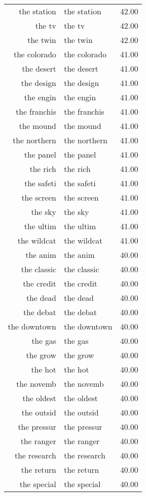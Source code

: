 \begin{table}[ht]
\begin{tabular}{rlr}
  the station & the station & 42.00 \\ 
  the tv & the tv & 42.00 \\ 
  the twin & the twin & 42.00 \\ 
  the colorado & the colorado & 41.00 \\ 
  the desert & the desert & 41.00 \\ 
  the design & the design & 41.00 \\ 
  the engin & the engin & 41.00 \\ 
  the franchis & the franchis & 41.00 \\ 
  the mound & the mound & 41.00 \\ 
  the northern & the northern & 41.00 \\ 
  the panel & the panel & 41.00 \\ 
  the rich & the rich & 41.00 \\ 
  the safeti & the safeti & 41.00 \\ 
  the screen & the screen & 41.00 \\ 
  the sky & the sky & 41.00 \\ 
  the ultim & the ultim & 41.00 \\ 
  the wildcat & the wildcat & 41.00 \\ 
  the anim & the anim & 40.00 \\ 
  the classic & the classic & 40.00 \\ 
  the credit & the credit & 40.00 \\ 
  the dead & the dead & 40.00 \\ 
  the debat & the debat & 40.00 \\ 
  the downtown & the downtown & 40.00 \\ 
  the gas & the gas & 40.00 \\ 
  the grow & the grow & 40.00 \\ 
  the hot & the hot & 40.00 \\ 
  the novemb & the novemb & 40.00 \\ 
  the oldest & the oldest & 40.00 \\ 
  the outsid & the outsid & 40.00 \\ 
  the pressur & the pressur & 40.00 \\ 
  the ranger & the ranger & 40.00 \\ 
  the research & the research & 40.00 \\ 
  the return & the return & 40.00 \\ 
  the special & the special & 40.00 \\ 

\end{tabular}
\end{table}
